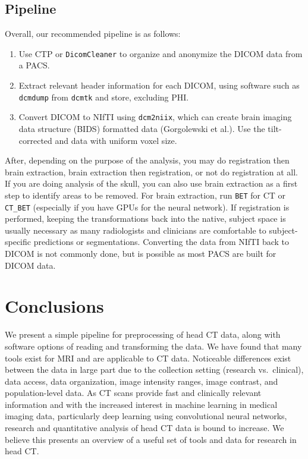 \documentclass[utf8]{frontiersSCNS}
\providecommand{\tightlist}{%
  \setlength{\itemsep}{0pt}\setlength{\parskip}{0pt}}
\begin{document}
\hypertarget{pipeline}{%
\subsection{Pipeline}\label{pipeline}}

Overall, our recommended pipeline is as follows:

\begin{enumerate}
\def\labelenumi{\arabic{enumi}.}
\tightlist
\item
  Use CTP or \texttt{DicomCleaner} to organize and anonymize the DICOM data from a PACS.
\item
  Extract relevant header information for each DICOM, using software such as \texttt{dcmdump} from \texttt{dcmtk} and store, excluding PHI.
\item
  Convert DICOM to NIfTI using \texttt{dcm2niix}, which can create brain imaging data structure (BIDS) formatted data (Gorgolewski et al.). Use the tilt-corrected and data with uniform voxel size.
\end{enumerate}

After, depending on the purpose of the analysis, you may do registration then brain extraction, brain extraction then registration, or not do registration at all. If you are doing analysis of the skull, you can also use brain extraction as a first step to identify areas to be removed. For brain extraction, run \texttt{BET} for CT or \texttt{CT\_BET} (especially if you have GPUs for the neural network). If registration is performed, keeping the transformations back into the native, subject space is usually necessary as many radiologists and clinicians are comfortable to subject-specific predictions or segmentations. Converting the data from NIfTI back to DICOM is not commonly done, but is possible as most PACS are built for DICOM data.

\hypertarget{conclusions}{%
\section{Conclusions}\label{conclusions}}

We present a simple pipeline for preprocessing of head CT data, along with software options of reading and transforming the data. We have found that many tools exist for MRI and are applicable to CT data. Noticeable differences exist between the data in large part due to the collection setting (research vs.~clinical), data access, data organization, image intensity ranges, image contrast, and population-level data. As CT scans provide fast and clinically relevant information and with the increased interest in machine learning in medical imaging data, particularly deep learning using convolutional neural networks, research and quantitative analysis of head CT data is bound to increase. We believe this presents an overview of a useful set of tools and data for research in head CT.
\end{document}
